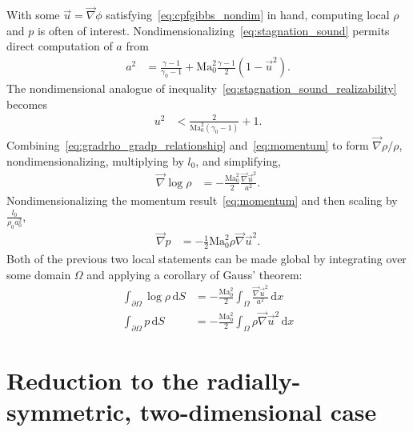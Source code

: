 \documentclass[letterpaper,11pt,nointlimits,reqno]{amsart}
\newcommand{\Mach}[1][]{\mbox{Ma}_{#1}}
\begin{document}
With some $\vec{u}=\vec{\nabla}\phi$ satisfying~\eqref{eq:cpfgibbs_nondim} in
hand, computing local $\rho$ and $p$ is often of interest.
Nondimensionalizing~\eqref{eq:stagnation_sound} permits direct computation of
$a$ from
\begin{align}
  a^2 &= \frac{\gamma-1}{\gamma_0-1}
       + \Mach[0]^2\frac{\gamma-1}{2}\left(1-\vec{u}^2\right)
\label{eq:stagnation_sound_nondim}
.
\end{align}
The nondimensional analogue of
inequality~\eqref{eq:stagnation_sound_realizability} becomes
\begin{align}
  u^2 &< \frac{2}{\Mach[0]^2\left(\gamma_0-1\right)} + 1
.
\label{eq:stagnation_sound_realizability_nondim}
\end{align}
Combining~\eqref{eq:gradrho_gradp_relationship} and~\eqref{eq:momentum} to form
$\vec{\nabla}\rho / \rho$, nondimensionalizing, multiplying by $l_0$, and
simplifying,
\begin{align}
  \vec{\nabla}\log\rho
  &=
  -\frac{\Mach[0]^2}{2}\frac{\vec{\nabla}\vec{u}^2}{a^2}
.
\end{align}
Nondimensionalizing the momentum result~\eqref{eq:momentum} and then scaling by
$\frac{l_0}{\rho_0 a_0^2}$,
\begin{align}
  \vec{\nabla} p &= - \frac{1}{2}\Mach[0]^2 \rho \vec{\nabla}\vec{u}^2
.
\end{align}
Both of the previous two local statements can be made global by integrating
over some domain $\Omega$ and applying a corollary of Gauss' theorem:
\begin{align}
  \int_{\partial\Omega} \log\rho \, \mathrm{d}S
  &=
  - \frac{\Mach[0]^2}{2}\int_{\Omega}
    \frac{\vec{\nabla}\vec{u}^2}{a^2} \, \mathrm{d}x
\label{eq:logrho_nondim}
\\
  \int_{\partial\Omega} p \, \mathrm{d}S
  &=
  - \frac{\Mach[0]^2}{2}\int_{\Omega} \rho \vec{\nabla}\vec{u}^2 \, \mathrm{d}x
\label{eq:p_nondim}
\end{align}

\section{Reduction to the radially-symmetric, two-dimensional case}
\end{document}
